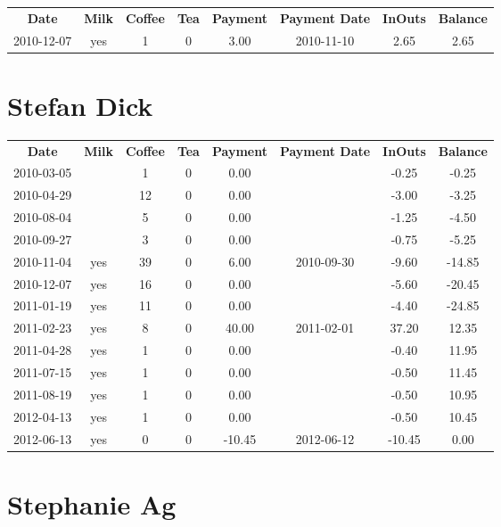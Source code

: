 \begin{center}
\begin{tabular}{cccccccc}
\textbf{Date} & \textbf{Milk} & \textbf{Coffee} & \textbf{Tea} & \textbf{Payment} & \textbf{Payment Date} & \textbf{InOuts} & \textbf{Balance} \\
2010-12-07 & yes & 1 & 0 & 3.00 & 2010-11-10 & 2.65 & 2.65
\end{tabular}
\end{center}

\section{Stefan Dick}

\begin{center}
\begin{tabular}{cccccccc}
\textbf{Date} & \textbf{Milk} & \textbf{Coffee} & \textbf{Tea} & \textbf{Payment} & \textbf{Payment Date} & \textbf{InOuts} & \textbf{Balance} \\
2010-03-05 &  &  1 & 0 &   0.00 &  &  -0.25 &  -0.25\\ 
2010-04-29 &  & 12 & 0 &   0.00 &  &  -3.00 &  -3.25\\ 
2010-08-04 &  &  5 & 0 &   0.00 &  &  -1.25 &  -4.50\\ 
2010-09-27 &  &  3 & 0 &   0.00 &  &  -0.75 &  -5.25\\ 
2010-11-04 & yes & 39 & 0 &   6.00 & 2010-09-30 &  -9.60 & -14.85\\ 
2010-12-07 & yes & 16 & 0 &   0.00 &  &  -5.60 & -20.45\\ 
2011-01-19 & yes & 11 & 0 &   0.00 &  &  -4.40 & -24.85\\ 
2011-02-23 & yes &  8 & 0 &  40.00 & 2011-02-01 &  37.20 &  12.35\\ 
2011-04-28 & yes &  1 & 0 &   0.00 &  &  -0.40 &  11.95\\ 
2011-07-15 & yes &  1 & 0 &   0.00 &  &  -0.50 &  11.45\\ 
2011-08-19 & yes &  1 & 0 &   0.00 &  &  -0.50 &  10.95\\ 
2012-04-13 & yes &  1 & 0 &   0.00 &  &  -0.50 &  10.45\\ 
2012-06-13 & yes &  0 & 0 & -10.45 & 2012-06-12 & -10.45 &   0.00
\end{tabular}
\end{center}

\section{Stephanie Ag}

